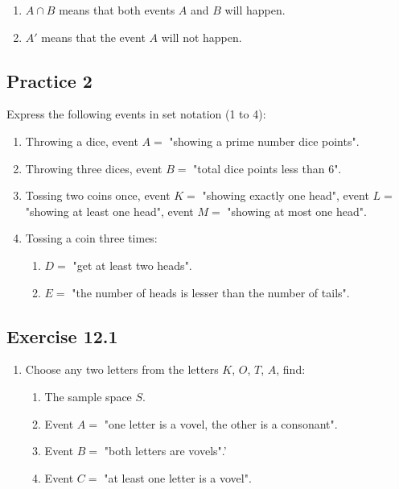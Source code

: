 \documentclass{report}
\begin{document}
\begin{multicols}{2}
\begin{enumerate}
    \item $A \cap B$ means that both events $A$ and $B$ will happen.

    \item $A'$ means that the event $A$ will not happen.
  \end{enumerate}

  \subsection{Practice 2}

  Express the following events in set notation (1 to 4):
  \begin{enumerate}
    \item Throwing a dice, event $A = $ "showing a prime number dice points".

    \item Throwing three dices, event $B = $ "total dice points less than 6".

    \item Tossing two coins once, event $K = $ "showing exactly one head", event $L = $
          "showing at least one head", event $M = $ "showing at most one head".

    \item Tossing a coin three times:
          \begin{enumerate}
            \item $D = $ "get at least two heads".
            \item $E = $ "the number of heads is lesser than the number of tails".
          \end{enumerate}
  \end{enumerate}

  \subsection{Exercise 12.1}

  \begin{enumerate}
    \item Choose any two letters from the letters $K$, $O$, $T$, $A$, find:
          \begin{enumerate}
            \item The sample space $S$.
            \item Event $A = $ "one letter is a vovel, the other is a consonant".
            \item Event $B = $ "both letters are vovels".'
            \item Event $C = $ "at least one letter is a vovel".
          \end{enumerate}


\end{enumerate}
\end{multicols}
\end{document}

